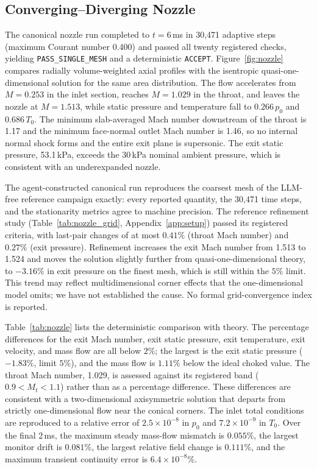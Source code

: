 \documentclass[11pt]{article}
\begin{document}
\subsection{Converging--Diverging Nozzle}
\label{sec:nozzle_results}

The canonical nozzle run completed to $t=6$\,ms in 30,471 adaptive steps
(maximum Courant number 0.400) and passed all twenty registered checks,
yielding \texttt{PASS\_SINGLE\_MESH} and a deterministic \texttt{ACCEPT}.
Figure~\ref{fig:nozzle} compares radially volume-weighted axial profiles
with the isentropic quasi-one-dimensional solution for the same area
distribution. The flow accelerates from $M=0.253$ in the inlet section,
reaches $M=1.029$ in the throat, and leaves the nozzle at $M=1.513$, while
static pressure and temperature fall to $0.266\,p_0$ and $0.686\,T_0$. The
minimum slab-averaged Mach number downstream of the throat is 1.17 and the
minimum face-normal outlet Mach number is 1.46, so no internal normal shock
forms and the entire exit plane is supersonic. The exit static pressure,
53.1\,kPa, exceeds the 30\,kPa nominal ambient pressure, which is consistent
with an underexpanded nozzle.

The agent-constructed canonical run reproduces the coarsest mesh of the
LLM-free reference campaign exactly: every reported quantity, the 30,471
time steps, and the stationarity metrics agree to machine precision. The
reference refinement study (Table~\ref{tab:nozzle_grid}, Appendix~\ref{app:setup}) passed its
registered criteria, with last-pair changes of at most $0.41\%$ (throat
Mach number) and $0.27\%$ (exit pressure). Refinement increases the exit Mach
number from 1.513 to 1.524 and moves the solution slightly further from
quasi-one-dimensional theory, to $-3.16\%$ in exit pressure on the finest
mesh, which is still within the $5\%$ limit. This trend may reflect multidimensional corner effects that the
one-dimensional model omits; we have not established the cause. No formal grid-convergence index is reported.

Table~\ref{tab:nozzle} lists the deterministic comparison with theory.
The percentage differences for the exit Mach number, exit static pressure,
exit temperature, exit velocity, and mass flow are all below $2\%$; the
largest is the exit static pressure ($-1.83\%$, limit $5\%$), and the mass
flow is $1.11\%$ below the ideal choked value. The throat Mach number, 1.029,
is assessed against its registered band ($0.9<M_t<1.1$) rather than as a
percentage difference. These differences are consistent with a two-dimensional
axisymmetric solution that departs from strictly one-dimensional flow near
the conical corners. The inlet total conditions are reproduced to a relative
error of $2.5\times10^{-8}$ in $p_0$ and $7.2\times10^{-9}$ in $T_0$. Over
the final 2\,ms, the maximum steady mass-flow mismatch is $0.055\%$, the
largest monitor drift is $0.081\%$, the largest relative field change is
$0.111\%$, and the maximum transient continuity error is
$6.4\times10^{-8}\%$.
\end{document}
